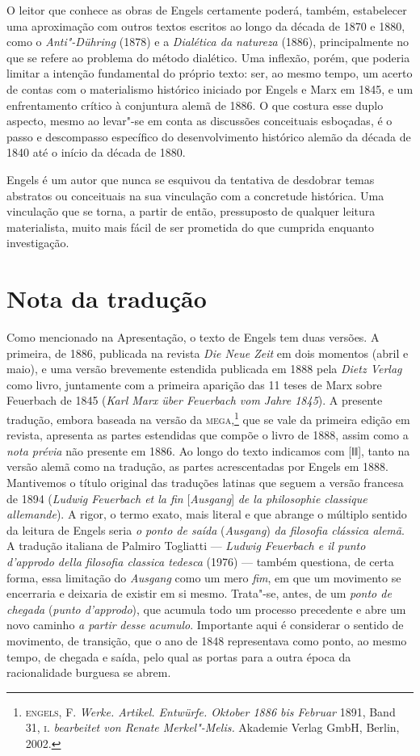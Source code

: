 O leitor que conhece as obras de Engels certamente poderá,
também, estabelecer uma aproximação com outros textos escritos ao longo
da década de 1870 e 1880, como o \emph{Anti"-Dühring} (1878) e a
\emph{Dialética da natureza} (1886), principalmente no que se refere ao
problema do método dialético. Uma inflexão, porém, que poderia limitar a
intenção fundamental do próprio texto: ser, ao mesmo tempo,
um acerto de contas com o materialismo histórico iniciado por Engels e
Marx em 1845, e um enfrentamento crítico à conjuntura alemã de 1886. O
que costura esse duplo aspecto, mesmo ao levar"-se em conta as discussões
conceituais esboçadas, é o passo e descompasso específico do
desenvolvimento histórico alemão da década de 1840 até o início da década de 1880.

Engels é um autor que nunca se esquivou da tentativa de desdobrar temas
abstratos ou conceituais na sua vinculação com a concretude histórica.
Uma vinculação que se torna, a partir de então, pressuposto de qualquer
leitura materialista, muito mais fácil de ser prometida do que cumprida
enquanto investigação.

\pagebreak
\section*{Nota da tradução}

Como mencionado na Apresentação, o texto de Engels tem duas versões. A primeira, de 1886, publicada na revista \emph{Die Neue Zeit} em dois momentos (abril e maio), e uma
versão brevemente estendida publicada em 1888 pela \emph{Dietz Verlag}
como livro, juntamente com a primeira aparição das 11 teses de Marx
sobre Feuerbach de 1845 (\emph{Karl Marx über Feuerbach vom Jahre
1845}). A presente tradução, embora baseada na versão da
\textsc{mega},\footnote[*]{\textsc{engels}, F. \emph{Werke. Artikel. Entwürfe.
Oktober 1886 bis Februar} 1891, Band 31, \textsc{i}. \emph{bearbeitet
von Renate Merkel"-Melis.} Akademie Verlag GmbH, Berlin, 2002.} que se
vale da primeira edição em revista, apresenta as partes estendidas que compõe o
livro de 1888, assim como a \emph{nota prévia} não presente em 1886. Ao
longo do texto indicamos com {[}ǁǁ{]}, tanto na versão alemã como na
tradução, as partes acrescentadas por Engels em 1888. Mantivemos o título original das traduções latinas que
seguem a versão francesa de 1894 (\emph{Ludwig Feuerbach et la fin}
{[}\emph{Ausgang}{]} \emph{de la philosophie classique allemande}). A
rigor, o termo exato, mais literal e que abrange o múltiplo sentido da
leitura de Engels seria \emph{o ponto de saída} (\emph{Ausgang})
\emph{da filosofia clássica alemã}. A tradução italiana de Palmiro
Togliatti --- \emph{Ludwig Feuerbach e il punto d'approdo della filosofia
classica tedesca} (1976) --- também questiona, de certa forma, essa
limitação do \emph{Ausgang} como um mero \emph{fim}, em que um movimento
se encerraria e deixaria de existir em si mesmo. Trata"-se, antes, de um
\emph{ponto de chegada} (\emph{punto d'approdo}), que acumula todo um
processo precedente e abre um novo caminho \emph{a partir} \emph{desse}
\emph{acumulo}. Importante aqui é considerar o sentido de movimento, de
transição, que o ano de 1848 representava como ponto, ao mesmo tempo,
de chegada e saída, pelo qual as portas para a outra época da
racionalidade burguesa se abrem.
